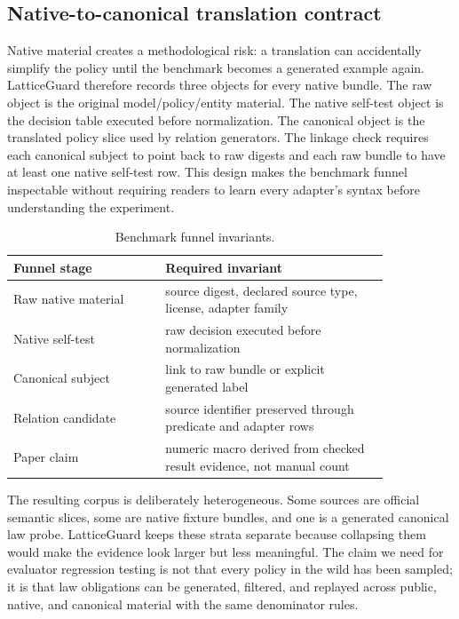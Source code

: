 \documentclass[10pt,conference]{IEEEtran}
\begin{document}
\subsection{Native-to-canonical translation contract}
Native material creates a methodological risk: a translation can accidentally simplify the policy until the benchmark becomes a generated example again.  LatticeGuard therefore records three objects for every native bundle.  The raw object is the original model/policy/entity material.  The native self-test object is the decision table executed before normalization.  The canonical object is the translated policy slice used by relation generators.  The linkage check requires each canonical subject to point back to raw digests and each raw bundle to have at least one native self-test row.  This design makes the benchmark funnel inspectable without requiring readers to learn every adapter's syntax before understanding the experiment.

\begin{table}[t]
\centering
\caption{Benchmark funnel invariants.}
\label{tab:funnel}
\begin{tabular}{p{0.34\linewidth}p{0.50\linewidth}}
\toprule
Funnel stage & Required invariant \\
\midrule
Raw native material & source digest, declared source type, license, adapter family \\
Native self-test & raw decision executed before normalization \\
Canonical subject & link to raw bundle or explicit generated label \\
Relation candidate & source identifier preserved through predicate and adapter rows \\
Paper claim & numeric macro derived from checked result evidence, not manual count \\
\bottomrule
\end{tabular}
\end{table}

The resulting corpus is deliberately heterogeneous.  Some sources are official semantic slices, some are native fixture bundles, and one is a generated canonical law probe.  LatticeGuard keeps these strata separate because collapsing them would make the evidence look larger but less meaningful.  The claim we need for evaluator regression testing is not that every policy in the wild has been sampled; it is that law obligations can be generated, filtered, and replayed across public, native, and canonical material with the same denominator rules.
\end{document}
